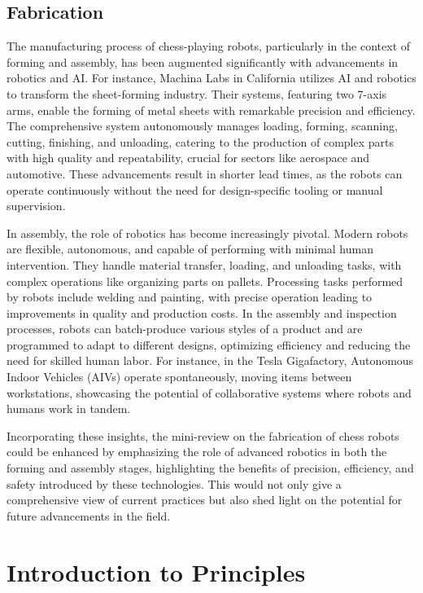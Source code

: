 \documentclass[10pt, a4paper, twocolumn]{article}
\begin{document}
\subsection{Fabrication}
The manufacturing process of chess-playing robots, particularly in the context of forming and assembly, has been augmented significantly with advancements in robotics and AI. For instance, Machina Labs in California utilizes AI and robotics to transform the sheet-forming industry. Their systems, featuring two 7-axis arms, enable the forming of metal sheets with remarkable precision and efficiency\cite{Khalid2023}. The comprehensive system autonomously manages loading, forming, scanning, cutting, finishing, and unloading, catering to the production of complex parts with high quality and repeatability, crucial for sectors like aerospace and automotive. These advancements result in shorter lead times, as the robots can operate continuously without the need for design-specific tooling or manual supervision\cite{harfoush2021application}.

In assembly, the role of robotics has become increasingly pivotal. Modern robots are flexible, autonomous, and capable of performing with minimal human intervention. They handle material transfer, loading, and unloading tasks, with complex operations like organizing parts on pallets. Processing tasks performed by robots include welding and painting, with precise operation leading to improvements in quality and production costs. In the assembly and inspection processes, robots can batch-produce various styles of a product and are programmed to adapt to different designs, optimizing efficiency and reducing the need for skilled human labor. For instance, in the Tesla Gigafactory, Autonomous Indoor Vehicles (AIVs) operate spontaneously, moving items between workstations, showcasing the potential of collaborative systems where robots and humans work in tandem\cite{RobotsNet2019}.

Incorporating these insights, the mini-review on the fabrication of chess robots could be enhanced by emphasizing the role of advanced robotics in both the forming and assembly stages, highlighting the benefits of precision, efficiency, and safety introduced by these technologies. This would not only give a comprehensive view of current practices but also shed light on the potential for future advancements in the field.

\section{Introduction to Principles}
\end{document}
